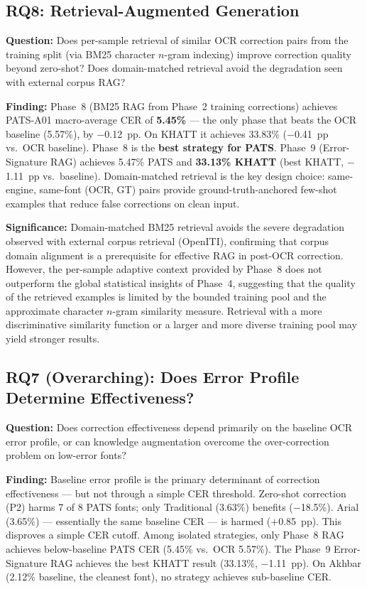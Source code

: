 \subsection*{RQ8: Retrieval-Augmented Generation}

\textbf{Question:} Does per-sample retrieval of similar OCR correction pairs
from the training split (via BM25 character $n$-gram indexing) improve
correction quality beyond zero-shot? Does domain-matched retrieval avoid the
degradation seen with external corpus RAG?

\textbf{Finding:} Phase~8 (BM25 RAG from Phase~2 training corrections)
achieves PATS-A01 macro-average CER of \textbf{5.45\%} --- the only phase
that beats the OCR baseline (5.57\%), by $-$0.12~pp. On KHATT it achieves
33.83\% ($-$0.41~pp vs.\ OCR baseline). Phase~8 is the \textbf{best
strategy for PATS}. Phase~9 (Error-Signature RAG) achieves 5.47\% PATS
and \textbf{33.13\% KHATT} (best KHATT, $-$1.11~pp vs.\ baseline).
Domain-matched retrieval is the key design choice: same-engine, same-font
(OCR, GT) pairs provide ground-truth-anchored few-shot examples that reduce
false corrections on clean input.

\textbf{Significance:} Domain-matched BM25 retrieval avoids the severe
degradation observed with external corpus retrieval (OpenITI), confirming
that corpus domain alignment is a prerequisite for effective RAG in
post-OCR correction. However, the per-sample adaptive context provided by
Phase~8 does not outperform the global statistical insights of Phase~4,
suggesting that the quality of the retrieved examples is limited by the
bounded training pool and the approximate character $n$-gram similarity
measure. Retrieval with a more discriminative similarity function or a
larger and more diverse training pool may yield stronger results.

\subsection*{RQ7 (Overarching): Does Error Profile Determine Effectiveness?}

\textbf{Question:} Does correction effectiveness depend primarily on the
baseline OCR error profile, or can knowledge augmentation overcome the
over-correction problem on low-error fonts?

\textbf{Finding:} Baseline error profile is the primary determinant of
correction effectiveness --- but not through a simple CER threshold.
Zero-shot correction (P2) harms 7 of 8 PATS fonts; only Traditional
(3.63\%) benefits ($-$18.5\%). Arial (3.65\%) --- essentially the same
baseline CER --- is harmed ($+$0.85~pp). This disproves a simple CER
cutoff. Among isolated strategies, only Phase~8 RAG achieves below-baseline
PATS CER (5.45\% vs.\ OCR 5.57\%). The Phase~9 Error-Signature RAG
achieves the best KHATT result (33.13\%, $-$1.11~pp). On Akhbar (2.12\%
baseline, the cleanest font), no strategy achieves sub-baseline CER.


